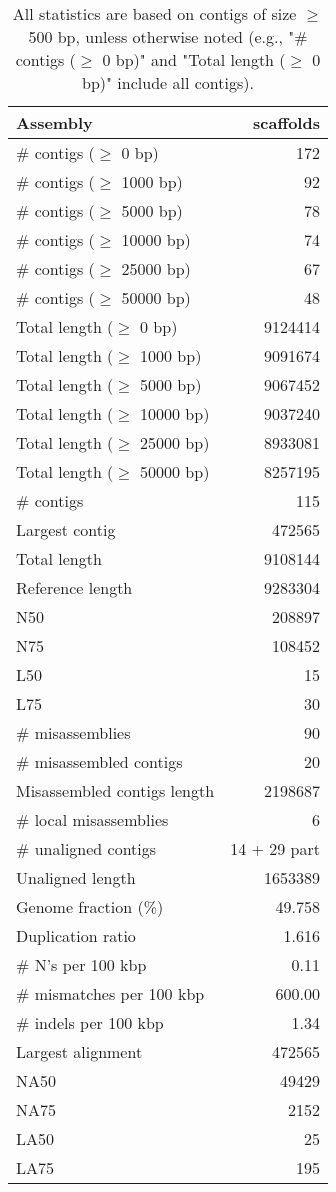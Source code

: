 \documentclass[12pt,a4paper]{article}
\begin{document}
\begin{table}[ht]
\begin{center}
\caption{All statistics are based on contigs of size $\geq$ 500 bp, unless otherwise noted (e.g., "\# contigs ($\geq$ 0 bp)" and "Total length ($\geq$ 0 bp)" include all contigs).}
\begin{tabular}{|l*{1}{|r}|}
\hline
Assembly & scaffolds \\ \hline
\# contigs ($\geq$ 0 bp) & 172 \\ \hline
\# contigs ($\geq$ 1000 bp) & 92 \\ \hline
\# contigs ($\geq$ 5000 bp) & 78 \\ \hline
\# contigs ($\geq$ 10000 bp) & 74 \\ \hline
\# contigs ($\geq$ 25000 bp) & 67 \\ \hline
\# contigs ($\geq$ 50000 bp) & 48 \\ \hline
Total length ($\geq$ 0 bp) & 9124414 \\ \hline
Total length ($\geq$ 1000 bp) & 9091674 \\ \hline
Total length ($\geq$ 5000 bp) & 9067452 \\ \hline
Total length ($\geq$ 10000 bp) & 9037240 \\ \hline
Total length ($\geq$ 25000 bp) & 8933081 \\ \hline
Total length ($\geq$ 50000 bp) & 8257195 \\ \hline
\# contigs & 115 \\ \hline
Largest contig & 472565 \\ \hline
Total length & 9108144 \\ \hline
Reference length & 9283304 \\ \hline
N50 & 208897 \\ \hline
N75 & 108452 \\ \hline
L50 & 15 \\ \hline
L75 & 30 \\ \hline
\# misassemblies & 90 \\ \hline
\# misassembled contigs & 20 \\ \hline
Misassembled contigs length & 2198687 \\ \hline
\# local misassemblies & 6 \\ \hline
\# unaligned contigs & 14 + 29 part \\ \hline
Unaligned length & 1653389 \\ \hline
Genome fraction (\%) & 49.758 \\ \hline
Duplication ratio & 1.616 \\ \hline
\# N's per 100 kbp & 0.11 \\ \hline
\# mismatches per 100 kbp & 600.00 \\ \hline
\# indels per 100 kbp & 1.34 \\ \hline
Largest alignment & 472565 \\ \hline
NA50 & 49429 \\ \hline
NA75 & 2152 \\ \hline
LA50 & 25 \\ \hline
LA75 & 195 \\ \hline
\end{tabular}
\end{center}
\end{table}
\end{document}
